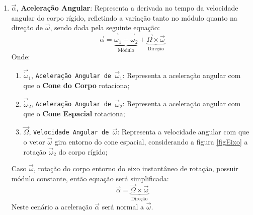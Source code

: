 \documentclass{article}
\begin{document}
                \begin{enumerate}[rightmargin = \leftmargin]
                    \item $\vec{\alpha}$, \textbf{Aceleração Angular}: Representa a derivada no tempo da velocidade angular do corpo rígido, refletindo a variação tanto no módulo quanto na direção de $\vec{\omega}$, sendo dada pela seguinte equação:
                        \begin{equation}
                            \boxed{
                                \vec{\alpha} = 
                                \underbrace{
                                    \vec{\dot{\omega}}_{1} +
                                    \vec{\dot{\omega}}_{2} 
                                }_{\text{Módulo}} +
                                \underbrace{
                                    \vec{\Omega}\times\vec{\omega}
                                }_{\text{Direção}}
                            }
                        \end{equation}
                    Onde:
                        \begin{enumerate}[rightmargin = \leftmargin]
                            \item $\vec{\dot{\omega}}_{1}$, \texttt{Aceleração Angular de $\vec{\omega}_{1}$}: Representa a aceleração angular com que o \textbf{Cone do Corpo} rotaciona;

                            \item $\vec{\dot{\omega}}_{2}$, \texttt{Aceleração Angular de $\vec{\omega}_{2}$}: Representa a aceleração angular com que o \textbf{Cone Espacial} rotaciona;

                            \item $\vec{\Omega}$, \texttt{Velocidade Angular de $\vec{\omega}$}: Representa a velocidade angular com que o vetor $\vec{\omega}$ gira entorno do cone espacial, considerando a figura \ref{figEixo} a rotação $\vec{\omega}_{2}$ do corpo rígido;
                        \end{enumerate}
                    Caso $\vec{\omega}$, rotação do corpo entorno do eixo instantâneo de rotação, possuir módulo constante, então equação será simplificada:
                        \begin{equation}
                            \boxed{
                                \vec{\alpha} = 
                                \underbrace{
                                    \vec{\Omega}\times\vec{\omega}
                                }_{\text{Direção}}
                            }
                        \end{equation}
                    Neste cenário a aceleração $\vec{\alpha}$ será normal a $\vec{\omega}$.
                \end{enumerate}
\newpage
\end{document}
